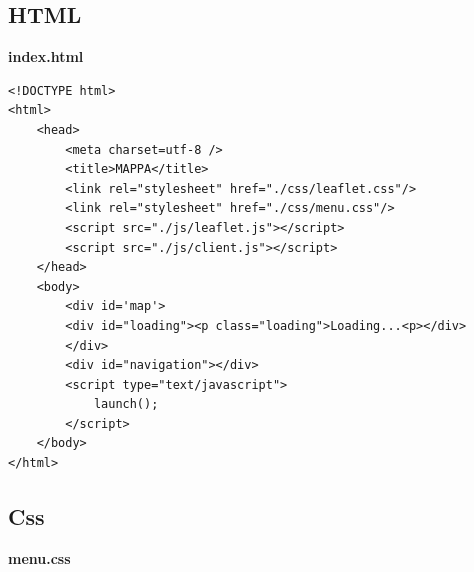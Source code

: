 \documentclass[a4paper,11pt]{article}
\begin{document}
\subsection{HTML}
\label{sec:6.2}
\textbf{\large index.html}
\begin{lstlisting}[style=htmlcssjs]
<!DOCTYPE html>
<html>
	<head>
		<meta charset=utf-8 />
		<title>MAPPA</title>
		<link rel="stylesheet" href="./css/leaflet.css"/>
		<link rel="stylesheet" href="./css/menu.css"/>		
		<script src="./js/leaflet.js"></script>
		<script src="./js/client.js"></script>		
	</head>
	<body>		
		<div id='map'>
		<div id="loading"><p class="loading">Loading...<p></div>
		</div>					
		<div id="navigation"></div>		
		<script type="text/javascript">
			launch();
		</script>
	</body>
</html>
\end{lstlisting}
\newpage
\subsection{Css}
\label{sec:6.3}
\textbf{\large menu.css}
\end{document}
